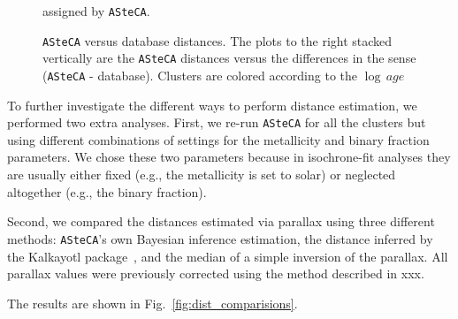 \documentclass[draft]{aa}
\begin{document}
  \begin{figure}
   \caption{\texttt{ASteCA} versus database distances. The plots to the right
   stacked vertically are the \texttt{ASteCA} distances versus the differences
   in the sense (\texttt{ASteCA} - database). Clusters are colored according to
   the $\log\,age$} assigned by \texttt{ASteCA}.
   \label{fig:distances}
  \end{figure}


  To further investigate the different ways to perform distance estimation,
  we performed two extra analyses. First, we re-run \texttt{ASteCA} for all the
  clusters but using different combinations of settings for the metallicity and
  binary fraction parameters. We chose these two parameters because in
  isochrone-fit analyses they are usually either fixed (e.g., the metallicity is
  set to solar) or neglected altogether (e.g., the binary fraction).

  Second, we compared the distances estimated via parallax using three
  different methods: \texttt{ASteCA}'s own Bayesian inference estimation, the
  distance inferred by the Kalkayotl package~\citep{Kalkayotl}, and the median
  of a simple inversion of the parallax. All parallax values were previously
  corrected using the method described in xxx.

  The results are shown in Fig.~\ref{fig:dist_comparisions}.\\

\end{document}
